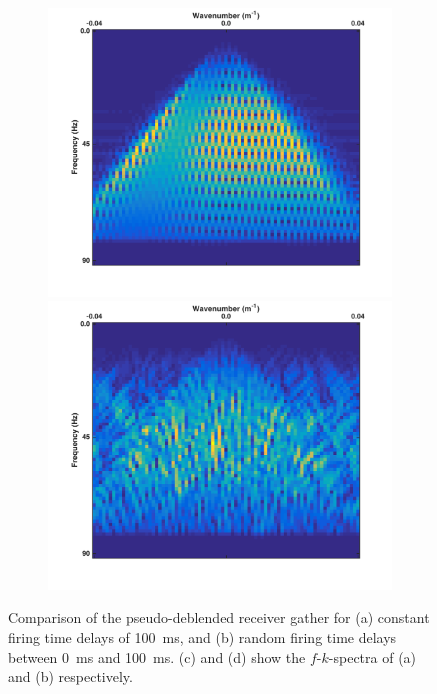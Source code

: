 \begin{figure}
\begin{subfigure}[b]{0.3\textwidth}
		\centering
		\includegraphics[width = \textwidth]{Plots/Mahdad/25iter/TimeDelay/FK-Pseudo-deblendedCRG_rec30_coh}
		\caption{}
		\label{fig:Ch-Theory-PseudoCRG-FK-CoherentDelay}
		
		\par\bigskip
		
		\centering
		\includegraphics[width = \textwidth]{Plots/Mahdad/25iter/TimeDelay/FK-Pseudo-deblendedCRG_rec30}
		\caption{}
		\label{fig:fig:Ch-Theory-PseudoCRG-FK-IncoherentDelay}
		
	\end{subfigure}
	
	\caption{Comparison of the pseudo-deblended receiver gather for (a) constant firing time delays of \SI{100}{\milli\second}, and (b) random firing time delays between \SI{0}{\milli\second} and \SI{100}{\milli\second}. (c) and (d) show the $f$-$k$-spectra of (a) and (b) respectively.}
	\label{fig:Ch-Theory-PseudoCRG-IncoherencyEffect}

\end{figure}

